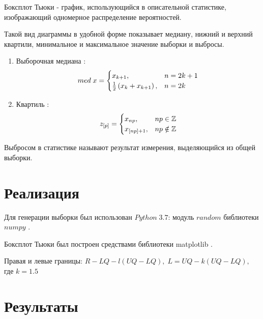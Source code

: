 \documentclass[12pt]{article}
\begin{document}
Боксплот Тьюки - график, использующийся в описательной статистике, изображающий одномерное распределение вероятностей. \cite{sas}

Такой вид диаграммы в удобной форме показывает медиану, нижний и верхний квартили, минимальное и максимальное значение выборки и выбросы.

\begin{enumerate}
\item Выборочная медиана \cite{med}:
\begin{equation}
med\; x = \begin{cases}
x_{k+1}, & n = 2k+1\\
\frac{1}{2}\left(x_k+x_{k+1}\right), & n = 2k
\end{cases} \hfill  \label{eqn:med}
\end{equation}

\item Квартиль \cite{quart}:
\begin{equation}
z_{[p]} = \begin{cases}
x_{np}, & np \in \mathbb{Z}\\
x_{[np]+1}, & np \notin \mathbb{Z}
\end{cases} \hfill  \label{eqn:quart}
\end{equation}
\end{enumerate}

Выбросом в статистике называют результат измерения, выделяющийся из общей выборки.


\section{Реализация}

Для генерации выборки был использован $Python\;3.7$: модуль $random$ библиотеки $numpy$ \cite{numpy}.

Боксплот Тьюки был построен средствами библиотеки matplotlib \cite{plotlib}.

Правая и левые границы:  $R- LQ - l(UQ - LQ),\;L = UQ -k(UQ - LQ),$ где $k=1.5$ 

\section{Результаты}
\end{document}
